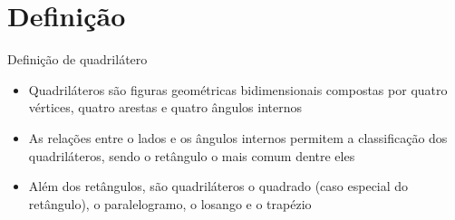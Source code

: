 \section{Definição}

\begin{frame}[fragile]{Definição de quadrilátero}

    \begin{itemize}
        \item Quadriláteros são figuras geométricas bidimensionais compostas por 
            quatro vértices, quatro arestas e quatro ângulos internos

        \item As relações entre o lados e os ângulos internos permitem a classificação dos 
            quadriláteros, sendo o retângulo o mais comum dentre eles

        \item Além dos retângulos, são quadriláteros o quadrado (caso especial do retângulo),
            o paralelogramo, o losango e o trapézio
    \end{itemize}

\end{frame}
